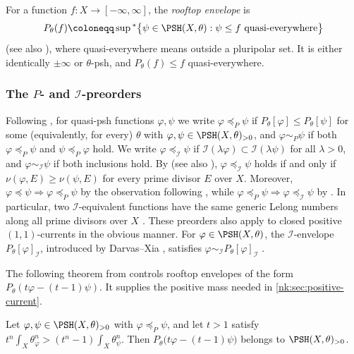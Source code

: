 For a function $f\colon X\to[-\infty,\infty]$, the \emph{rooftop
envelope} is
\[
  P_\theta(f)\coloneqq \sup{}^*\bigl\{\psi\in\PSH(X,\theta):
     \psi\le f\ \text{quasi-everywhere}\bigr\}
\]
\cite[Definition~2.4.1]{SGPT} (see also \cite{RWN14,DDNL18mono}),
where quasi-everywhere means outside a
pluripolar set. It is either identically $\pm\infty$ or $\theta$-psh, and
$P_\theta(f)\le f$ quasi-everywhere.

\subsubsection*{The \texorpdfstring{$P$}{P}- and
\texorpdfstring{$\mathcal I$}{I}-preorders}
Following \cite[Definition~6.1.1]{SGPT}, for quasi-psh functions
$\varphi,\psi$ we write $\varphi\preceq_P\psi$ if
$P_\theta[\varphi]\le P_\theta[\psi]$ for some (equivalently, for every)
$\theta$ with $\varphi,\psi\in\PSH(X,\theta)_{>0}$, and
$\varphi\sim_P\psi$ if both $\varphi\preceq_P\psi$ and $\psi\preceq_P\varphi$
hold. We write $\varphi\preceq_{\mathcal I}\psi$ if
$\mathcal I(\lambda\varphi)\subset\mathcal I(\lambda\psi)$ for all $\lambda>0$, and
$\varphi\sim_{\mathcal I}\psi$ if both inclusions hold. By
\cite[Proposition~6.1.2]{SGPT} (see also \cite{BFJ08}),
$\varphi\preceq_{\mathcal I}\psi$ holds if and only if
$\nu(\varphi,E)\ge\nu(\psi,E)$ for every prime divisor $E$ over
$X$. Moreover,
$\varphi\preceq\psi\Rightarrow\varphi\preceq_P\psi$ by the observation
following \cite[Definition~6.1.1]{SGPT}, while
$\varphi\preceq_P\psi\Rightarrow\varphi\preceq_{\mathcal I}\psi$ by
\cite[Corollary~6.1.1]{SGPT}. In particular, two
$\mathcal I$-equivalent functions have the same generic Lelong numbers along all
prime divisors over $X$ \cite[Proposition~3.2.1]{SGPT}. 
These preorders also apply to closed positive $(1,1)$-currents in the obvious manner.
For
$\varphi\in\PSH(X,\theta)$, the $\mathcal I$-envelope
$P_\theta[\varphi]_{\mathcal I}$, introduced by Darvas--Xia \cite{DX22},
satisfies $\varphi\sim_{\mathcal I} P_\theta[\varphi]_\mathcal I$
\cite[Proposition~3.2.6]{SGPT}.

The following theorem from \cite[Theorem~6.1.1]{SGPT} controls rooftop
envelopes of the form $P_\theta(t\varphi-(t-1)\psi)$. It supplies the
positive mass needed in \cref{nk:sec:positive-current}.

\begin{theorem}\label{nk:thm:rooftop}
Let $\varphi,\psi\in\PSH(X,\theta)_{>0}$ with $\varphi\preceq_P\psi$, and
let $t>1$ satisfy
$t^n\int_X\theta_\varphi^n>(t^n-1)\int_X\theta_\psi^n$. Then
$P_\theta\bigl(t\varphi-(t-1)\psi\bigr)$ belongs to
$\PSH(X,\theta)_{>0}$.
\end{theorem}

